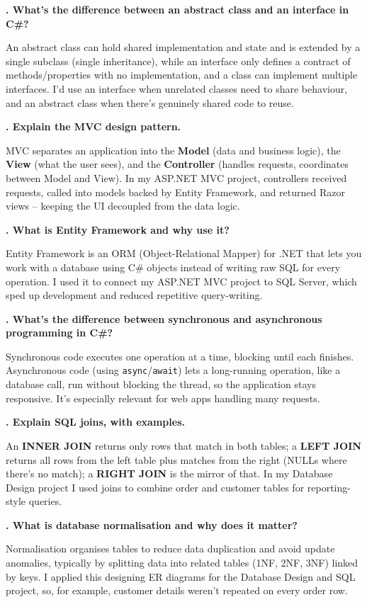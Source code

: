 \documentclass[10.5pt]{article}
\newcounter{qnum}
\newcommand{\qa}[2]{%
  \stepcounter{qnum}%
  \textbf{\theqnum. #1}\par
  #2\par
  \vspace{6pt}
}
\begin{document}
\qa{What's the difference between an abstract class and an interface in C\#?}{An abstract class can hold shared implementation and state and is extended by a single subclass (single inheritance), while an interface only defines a contract of methods/properties with no implementation, and a class can implement multiple interfaces. I'd use an interface when unrelated classes need to share behaviour, and an abstract class when there's genuinely shared code to reuse.}

\qa{Explain the MVC design pattern.}{MVC separates an application into the \textbf{Model} (data and business logic), the \textbf{View} (what the user sees), and the \textbf{Controller} (handles requests, coordinates between Model and View). In my ASP.NET MVC project, controllers received requests, called into models backed by Entity Framework, and returned Razor views -- keeping the UI decoupled from the data logic.}

\qa{What is Entity Framework and why use it?}{Entity Framework is an ORM (Object-Relational Mapper) for .NET that lets you work with a database using C\# objects instead of writing raw SQL for every operation. I used it to connect my ASP.NET MVC project to SQL Server, which sped up development and reduced repetitive query-writing.}

\qa{What's the difference between synchronous and asynchronous programming in C\#?}{Synchronous code executes one operation at a time, blocking until each finishes. Asynchronous code (using \texttt{async}/\texttt{await}) lets a long-running operation, like a database call, run without blocking the thread, so the application stays responsive. It's especially relevant for web apps handling many requests.}

\qa{Explain SQL joins, with examples.}{An \textbf{INNER JOIN} returns only rows that match in both tables; a \textbf{LEFT JOIN} returns all rows from the left table plus matches from the right (NULLs where there's no match); a \textbf{RIGHT JOIN} is the mirror of that. In my Database Design project I used joins to combine order and customer tables for reporting-style queries.}

\qa{What is database normalisation and why does it matter?}{Normalisation organises tables to reduce data duplication and avoid update anomalies, typically by splitting data into related tables (1NF, 2NF, 3NF) linked by keys. I applied this designing ER diagrams for the Database Design and SQL project, so, for example, customer details weren't repeated on every order row.}
\end{document}
